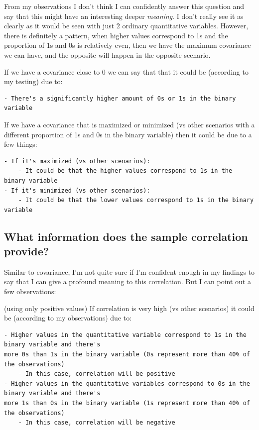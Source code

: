 \documentclass[]{article}
\begin{document}
From my observations I don't think I can confidently answer this
question and say that this might have an interesting deeper
\emph{meaning}. I don't really see it as clearly as it would be seen
with just 2 ordinary quantitative variables. However, there is
definitely a pattern, when higher values correspond to 1s and the
proportion of 1s and 0s is relatively even, then we have the maximum
covariance we can have, and the opposite will happen in the opposite
scenario.

If we have a covariance close to 0 we can say that that it could be
(according to my testing) due to:

\begin{verbatim}
- There's a significantly higher amount of 0s or 1s in the binary variable
\end{verbatim}

If we have a covariance that is maximized or minimized (vs other
scenarios with a different proportion of 1s and 0s in the binary
variable) then it could be due to a few things:

\begin{verbatim}
- If it's maximized (vs other scenarios):
    - It could be that the higher values correspond to 1s in the binary variable
- If it's minimized (vs other scenarios):
    - It could be that the lower values correspond to 1s in the binary variable
\end{verbatim}

\hypertarget{what-information-does-the-sample-correlation-provide}{%
\subsection{What information does the sample correlation
provide?}\label{what-information-does-the-sample-correlation-provide}}

Similar to covariance, I'm not quite sure if I'm confident enough in my
findings to say that I can give a profound meaning to this correlation.
But I can point out a few observations:

(using only positive values) If correlation is very high (vs other
scenarios) it could be (according to my observations) due to:

\begin{verbatim}
- Higher values in the quantitative variable correspond to 1s in the binary variable and there's 
more 0s than 1s in the binary variable (0s represent more than 40% of the observations)
    - In this case, correlation will be positive
- Higher values in the quantitative variables correspond to 0s in the binary variable and there's
more 1s than 0s in the binary variable (1s represent more than 40% of the observations)
    - In this case, correlation will be negative
\end{verbatim}
\end{document}
